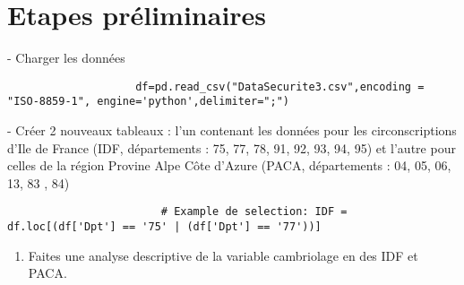 \documentclass[11pt,a4paper]{article}
\begin{document}
		\section{Etapes pr\'eliminaires}
			
					- Charger les donn\'ees
					\noindent
						\begin{lstlisting}
					df=pd.read_csv("DataSecurite3.csv",encoding = "ISO-8859-1", engine='python',delimiter=";")
						\end{lstlisting}
					 - Cr\'eer 2 nouveaux tableaux : l'un contenant les donn\'ees pour les circonscriptions d'Ile de France (IDF, d\'epartements : 75, 77, 78, 91, 92, 93, 94, 95) et l'autre pour celles de la r\'egion Provine Alpe C\^ote d'Azure (PACA, d\'epartements : 04, 05, 06, 13, 83 , 84)
						\begin{lstlisting}	
						# Example de selection: IDF = df.loc[(df['Dpt'] == '75' | (df['Dpt'] == '77'))]
						\end{lstlisting}
						\begin{enumerate}
							\item Faites une analyse descriptive de la variable cambriolage en des   IDF et PACA. 
				\end{enumerate}	
\end{document}
